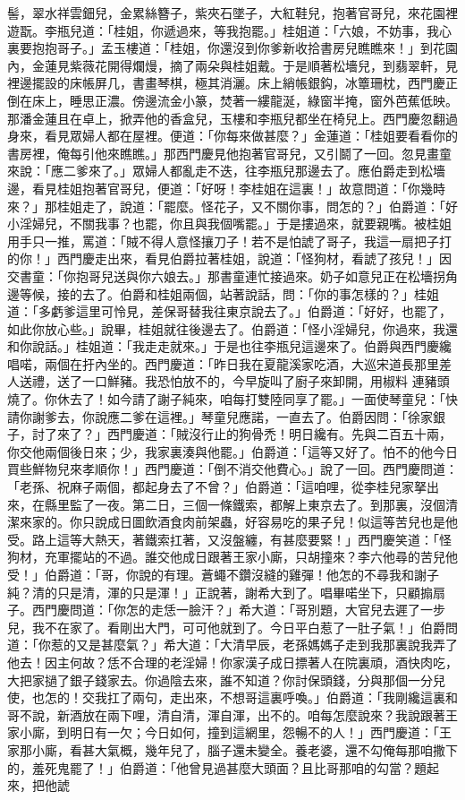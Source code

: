 \begin{showcontents}{}
髻，翠水祥雲鈿兒，金累絲簪子，紫夾石墜子，大紅鞋兒，抱著官哥兒，來花園裡遊翫。李瓶兒道：「桂姐，你遞過來，等我抱罷。」桂姐道：「六娘，不妨事，我心裏要抱抱哥子。」孟玉樓道：「桂姐，你還沒到你爹新收拾書房兒瞧瞧來！」到花園內，金蓮見紫薇花開得爛熳，摘了兩朵與桂姐戴。于是順著松墻兒，到翡翠軒，見裡邊擺設的床帳屏几，書畫琴棋，極其消灑。床上綃帳銀鈎，冰簟珊枕，西門慶正倒在床上，睡思正濃。傍邊流金小篆，焚著一縷龍涎，綠窗半掩，窗外芭蕉低映。那潘金蓮且在卓上，掀弄他的香盒兒，玉樓和李瓶兒都坐在椅兒上。西門慶忽翻過身來，看見眾婦人都在屋裡。便道：「你每來做甚麼？」金蓮道：「桂姐要看看你的書房裡，俺每引他來瞧瞧。」那西門慶見他抱著官哥兒，又引鬬了一回。忽見畫童來說：「應二爹來了。」眾婦人都亂走不迭，往李瓶兒那邊去了。應伯爵走到松墻邊，看見桂姐抱著官哥兒，便道：「好呀！李桂姐在這裏！」故意問道：「你幾時來？」那桂姐走了，說道：「罷麼。怪花子，又不關你事，問怎的？」伯爵道：「好小淫婦兒，不關我事？也罷，你且與我個嘴罷。」于是摟過來，就要親嘴。被桂姐用手只一推，罵道：「賊不得人意怪攘刀子！若不是怕諕了哥子，我這一扇把子打的你！」西門慶走出來，看見伯爵拉著桂姐，說道：「怪狗材，看諕了孩兒！」因交書童：「你抱哥兒送與你六娘去。」那書童連忙接過來。奶子如意兒正在松墻拐角邊等候，接的去了。伯爵和桂姐兩個，站著說話，問：「你的事怎樣的？」桂姐道：「多虧爹這里可怜見，差保哥替我往東京說去了。」伯爵道：「好好，也罷了，如此你放心些。」說畢，桂姐就往後邊去了。伯爵道：「怪小淫婦兒，你過來，我還和你說話。」桂姐道：「我走走就來。」于是也往李瓶兒這邊來了。伯爵與西門慶纔唱喏，兩個在扜內坐的。西門慶道：「昨日我在夏龍溪家吃酒，大巡宋道長那里差人送禮，送了一口鮮豬。我恐怕放不的，今早旋叫了廚子來卸開，用椒料 連豬頭燒了。你休去了！如今請了謝子純來，咱每打雙陸同享了罷。」一面使琴童兒：「快請你謝爹去，你說應二爹在這裡。」琴童兒應諾，一直去了。伯爵因問：「徐家銀子，討了來了？」西門慶道：「賊沒行止的狗骨禿！明日纔有。先與二百五十兩，你交他兩個後日來；少，我家裏湊與他罷。」伯爵道：「這等又好了。怕不的他今日買些鮮物兒來孝順你！」西門慶道：「倒不消交他費心。」說了一回。西門慶問道：「老孫、祝麻子兩個，都起身去了不曾？」伯爵道：「這咱哩，從李桂兒家拏出來，在縣里監了一夜。第二日，三個一條鐵索，都解上東京去了。到那裏，沒個清潔來家的。你只說成日圖飲酒食肉前架蟲，好容易吃的果子兒！似這等苦兒也是他受。路上這等大熱天，著鐵索扛著，又沒盤纏，有甚麼要緊！」西門慶笑道：「怪狗材，充軍擺站的不過。誰交他成日跟著王家小廝，只胡撞來？李六他尋的苦兒他受！」伯爵道：「哥，你說的有理。蒼蠅不鑽沒縫的雞彈！他怎的不尋我和謝子純？清的只是清，渾的只是渾！」正說著，謝希大到了。唱畢喏坐下，只顧搧扇子。西門慶問道：「你怎的走恁一臉汗？」希大道：「哥別題，大官兒去遲了一步兒，我不在家了。看剛出大門，可可他就到了。今日平白惹了一肚子氣！」伯爵問道：「你惹的又是甚麼氣？」希大道：「大清早辰，老孫媽媽子走到我那裏說我弄了他去！因主何故？恁不合理的老淫婦！你家漢子成日摽著人在院裏頑，酒快肉吃，大把家撾了銀子錢家去。你過陰去來，誰不知道？你討保頭錢，分與那個一分兒使，也怎的！交我扛了兩句，走出來，不想哥這裏呼喚。」伯爵道：「我剛纔這裏和哥不說，新酒放在兩下哩，清自清，渾自渾，出不的。咱每怎麼說來？我說跟著王家小廝，到明日有一欠；今日如何，撞到這網里，怨暢不的人！」西門慶道：「王家那小廝，看甚大氣概，幾年兒了，腦子還未變全。養老婆，還不勾俺每那咱撒下的，羞死鬼罷了！」伯爵道：「他曾見過甚麼大頭面？且比哥那咱的勾當？題起來，把他諕
\end{showcontents}
